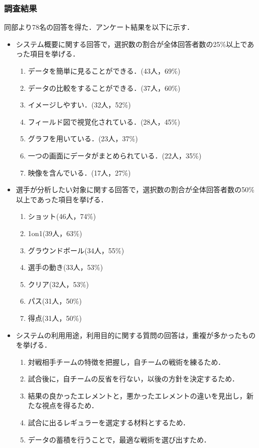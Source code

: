 \documentclass[sotsuron]{kuee}
\begin{document}
			\subsubsection{調査結果}
				同部より78名の回答を得た．アンケート結果を以下に示す．
				\begin{itemize}
				\item システム概要に関する回答で，選択数の割合が全体回答者数の25\%以上であった項目を挙げる．
					\begin{enumerate}
					\item データを簡単に見ることができる．(43人，69\%)
					\item データの比較をすることができる．(37人，60\%)
					\item イメージしやすい．(32人，52\%)
					\item フィールド図で視覚化されている．(28人，45\%)
					\item グラフを用いている．(23人，37\%)
					\item 一つの画面にデータがまとめられている．(22人，35\%)
					\item 映像を含んでいる．(17人，27\%)
					\end{enumerate}
				\item 選手が分析したい対象に関する回答で，選択数の割合が全体回答者数の50\%以上であった項目を挙げる．
					\begin{enumerate}
					\item ショット(46人，74\%)
					\item 1on1(39人，63\%)
					\item グラウンドボール(34人，55\%)
					\item 選手の動き(33人，53\%)
					\item クリア(32人，53\%)
					\item パス(31人，50\%)
					\item 得点(31人，50\%)
					\end{enumerate}
				\item システムの利用用途，利用目的に関する質問の回答は，重複が多かったものを挙げる．
					\begin{enumerate}
					\item 対戦相手チームの特徴を把握し，自チームの戦術を練るため．
					\item 試合後に，自チームの反省を行ない，以後の方針を決定するため．
					\item 結果の良かったエレメントと，悪かったエレメントの違いを見出し，新たな視点を得るため．
					\item 試合に出るレギュラーを選定する材料とするため．
					\item データの蓄積を行うことで，最適な戦術を選び出すため．
					\end{enumerate}
				\end{itemize}
\end{document}
